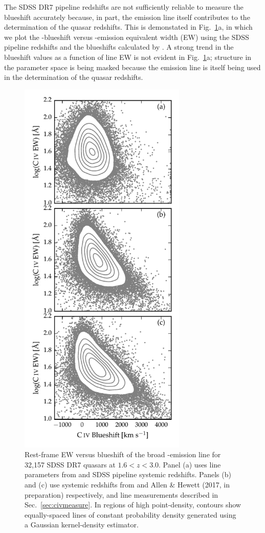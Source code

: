 The SDSS DR7 pipeline redshifts are not sufficiently reliable to measure the  blueshift accurately because, in part, the  emission line itself contributes to the determination of the quasar redshifts. 
This is demonstated in Fig.~\ref{fig:civ_space_z_compare}a, in which we plot the -blueshift versus -emission equivalent width (EW) using the SDSS pipeline redshifts and the blueshifts calculated by \citet{shen11}.  
A strong trend in the blueshift values as a function of line EW is not evident in Fig.~\ref{fig:civ_space_z_compare}a; structure in the parameter space is being masked because the  emission line is itself being used in the determination of the quasar redshifts. 

\begin{figure}
    \centering 
    \includegraphics[width=8cm]{figures/chapter03/civ_space_z_compare.pdf}
    \caption{Rest-frame EW versus blueshift of the broad -emission line for 32,157 SDSS DR7 quasars at $1.6 < z < 3.0$. Panel (a) uses  line parameters from \citet{shen11} and SDSS pipeline systemic redshifts. Panels (b) and (c) use systemic redshifts from \citet{hewett10} and Allen \& Hewett (2017, in preparation) respectively, and  line measurements described in Sec.~\ref{sec:civmeasure}. In regions of high point-density, contours show equally-spaced lines of constant probability density generated using a Gaussian kernel-density estimator.} 
    \label{fig:civ_space_z_compare}
\end{figure}

